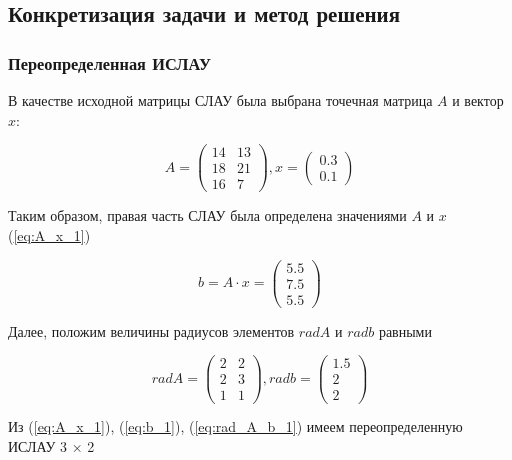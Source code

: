 \documentclass[12pt,a4paper]{scrartcl}
\begin{document}
\subsection{Конкретизация задачи и метод решения}
\subsubsection{Переопределенная ИСЛАУ}
	В качестве исходной матрицы СЛАУ была выбрана точечная матрица $A$ и вектор $x$:
	
	\begin{equation}
		A = \left(
		\begin{array}{cc}
		14 & 13 \\
		18 & 21\\
		16 & 7
		\end{array}
		\right),
		x = \left(
		\begin{array}{c}
		0.3 \\
		0.1
		\end{array}
		\right)
		\label{eq:A_x_1}
	\end{equation}

	Таким образом, правая часть СЛАУ была определена значениями $A$ и $x$ (\ref{eq:A_x_1})

	\begin{equation}
		b = A \cdot x = \left(
		\begin{array}{c}
		5.5 \\
		7.5 \\
		5.5
		\end{array}
		\right)
		\label{eq:b_1}
	\end{equation}

	Далее, положим величины радиусов элементов $rad A$ и $rad b$ равными

	\begin{equation}
		rad A = \left(
		\begin{array}{cc}
		2 & 2 \\
		2 & 3\\
		1 & 1
		\end{array}
		\right),
		rad b = \left(
		\begin{array}{c}
		1.5 \\
		2 \\
		2
		\end{array}
		\right)
		\label{eq:rad_A_b_1}
	\end{equation}

	Из (\ref{eq:A_x_1}), (\ref{eq:b_1}), (\ref{eq:rad_A_b_1}) имеем переопределенную ИСЛАУ 3 × 2
\end{document}
